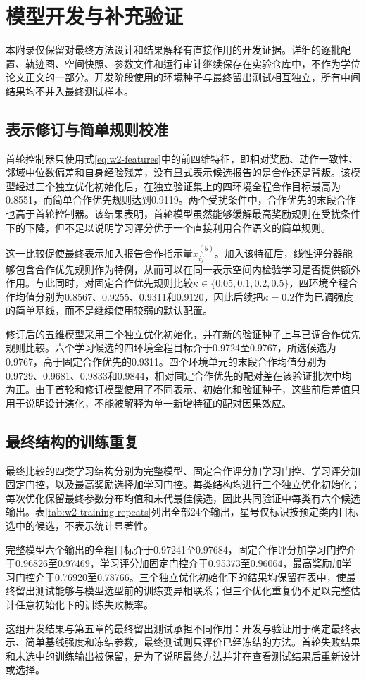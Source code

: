 \chapter{模型开发与补充验证}
\label{app:development-history}

本附录仅保留对最终方法设计和结果解释有直接作用的开发证据。详细的逐批配置、轨迹图、空间快照、参数文件和运行审计继续保存在实验仓库中，不作为学位论文正文的一部分。开发阶段使用的环境种子与最终留出测试相互独立，所有中间结果均不并入最终测试样本。

\section{表示修订与简单规则校准}

首轮控制器只使用式\eqref{eq:w2-features}中的前四维特征，即相对奖励、动作一致性、邻域中位数偏差和自身经验残差，没有显式表示候选报告的是合作还是背叛。该模型经过三个独立优化初始化后，在独立验证集上的四环境全程合作目标最高为0.8551，而简单合作优先规则达到0.9119。两个受扰条件中，合作优先的末段合作也高于首轮控制器。该结果表明，首轮模型虽然能够缓解最高奖励规则在受扰条件下的下降，但不足以说明学习评分优于一个直接利用合作语义的简单规则。

这一比较促使最终表示加入报告合作指示量$x_{ij}^{(5)}$。加入该特征后，线性评分器能够包含合作优先规则作为特例，从而可以在同一表示空间内检验学习是否提供额外作用。与此同时，对固定合作优先规则比较$\kappa\in\{0.05,0.1,0.2,0.5\}$，四环境全程合作均值分别为0.8567、0.9255、0.9311和0.9120，因此后续把$\kappa=0.2$作为已调强度的简单基线，而不是继续使用较弱的默认配置。

修订后的五维模型采用三个独立优化初始化，并在新的验证种子上与已调合作优先规则比较。六个学习候选的四环境全程目标介于0.9724至0.9767，所选候选为0.9767，高于固定合作优先的0.9311。四个环境单元的末段合作均值分别为0.9729、0.9681、0.9833和0.9844，相对固定合作优先的配对差在该验证批次中均为正。由于首轮和修订模型使用了不同表示、初始化和验证种子，这些前后差值只用于说明设计演化，不能被解释为单一新增特征的配对因果效应。

\section{最终结构的训练重复}

最终比较的四类学习结构分别为完整模型、固定合作评分加学习门控、学习评分加固定门控，以及最高奖励选择加学习门控。每类结构均进行三个独立优化初始化；每次优化保留最终参数分布均值和末代最佳候选，因此共同验证中每类有六个候选输出。表\ref{tab:w2-training-repeats}列出全部24个输出，星号仅标识按预定类内目标选中的候选，不表示统计显著性。



完整模型六个输出的全程目标介于0.97241至0.97684，固定合作评分加学习门控介于0.96826至0.97469，学习评分加固定门控介于0.95373至0.96064，最高奖励加学习门控介于0.76920至0.78766。三个独立优化初始化下的结果均保留在表中，使最终留出测试能够与模型选型前的训练变异相联系；但三个优化重复仍不足以完整估计任意初始化下的训练失败概率。

这组开发结果与第五章的最终留出测试承担不同作用：开发与验证用于确定最终表示、简单基线强度和冻结参数，最终测试则只评价已经冻结的方法。首轮失败结果和未选中的训练输出被保留，是为了说明最终方法并非在查看测试结果后重新设计或选择。